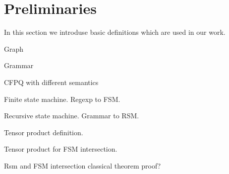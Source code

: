 \section{Preliminaries}

In this section we introduse basic definitions which are used in our work.

Graph

Grammar

CFPQ with different semantics

Finite state machine. Regexp to FSM.

Recursive state machine. Grammar to RSM.

Tensor product definition.

Tensor product for FSM intersection.

Rsm and FSM intersection classical theorem proof?
